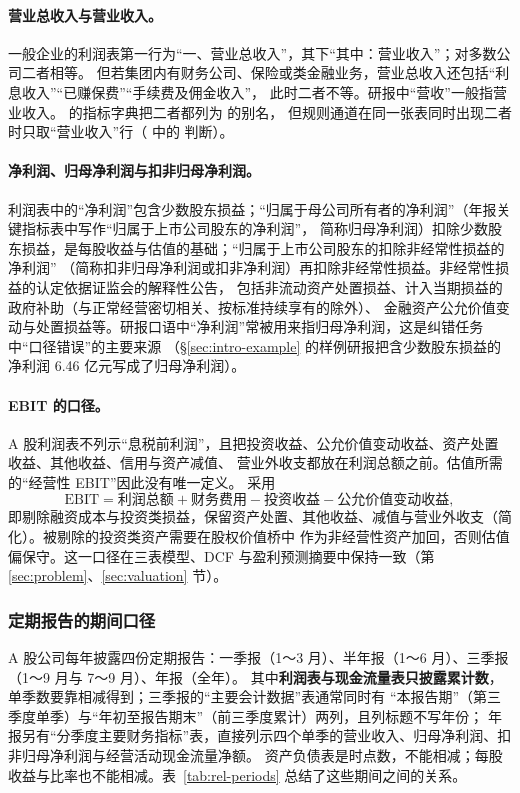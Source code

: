 \paragraph{营业总收入与营业收入。}
一般企业的利润表第一行为“一、营业总收入”，其下“其中：营业收入”；对多数公司二者相等。
但若集团内有财务公司、保险或类金融业务，营业总收入还包括“利息收入”“已赚保费”“手续费及佣金收入”，
此时二者不等。研报中“营收”一般指营业收入。\sysname{} 的指标字典把二者都列为  的别名，
但规则通道在同一张表同时出现二者时只取“营业收入”行（ 中的  判断）。

\paragraph{净利润、归母净利润与扣非归母净利润。}
利润表中的“净利润”包含少数股东损益；“归属于母公司所有者的净利润”（年报关键指标表中写作“归属于上市公司股东的净利润”，
简称归母净利润）扣除少数股东损益，是每股收益与估值的基础；“归属于上市公司股东的扣除非经常性损益的净利润”
（简称扣非归母净利润或扣非净利润）再扣除非经常性损益。非经常性损益的认定依据证监会的解释性公告\cite{csrc2023nonrecurring}，
包括非流动资产处置损益、计入当期损益的政府补助（与正常经营密切相关、按标准持续享有的除外）、
金融资产公允价值变动与处置损益等。研报口语中“净利润”常被用来指归母净利润，这是纠错任务中“口径错误”的主要来源
（\S\ref{sec:intro-example} 的样例研报把含少数股东损益的净利润 6.46 亿元写成了归母净利润）。

\paragraph{EBIT 的口径。}
A 股利润表不列示“息税前利润”，且把投资收益、公允价值变动收益、资产处置收益、其他收益、信用与资产减值、
营业外收支都放在利润总额之前。估值所需的“经营性 EBIT”因此没有唯一定义。\sysname{} 采用
\begin{equation}
\text{EBIT} = \text{利润总额} + \text{财务费用} - \text{投资收益} - \text{公允价值变动收益},
\label{eq:rel-ebit}
\end{equation}
即剔除融资成本与投资类损益，保留资产处置、其他收益、减值与营业外收支（简化）。被剔除的投资类资产需要在股权价值桥中
作为非经营性资产加回，否则估值偏保守。这一口径在三表模型、DCF 与盈利预测摘要中保持一致（第 \ref{sec:problem}、\ref{sec:valuation} 节）。

\subsubsection{定期报告的期间口径}
A 股公司每年披露四份定期报告：一季报（1～3 月）、半年报（1～6 月）、三季报（1～9 月与 7～9 月）、年报（全年）。
其中\textbf{利润表与现金流量表只披露累计数}，单季数要靠相减得到；三季报的“主要会计数据”表通常同时有
“本报告期”（第三季度单季）与“年初至报告期末”（前三季度累计）两列，且列标题不写年份；
年报另有“分季度主要财务指标”表，直接列示四个单季的营业收入、归母净利润、扣非归母净利润与经营活动现金流量净额。
资产负债表是时点数，不能相减；每股收益与比率也不能相减。表~\ref{tab:rel-periods} 总结了这些期间之间的关系。

